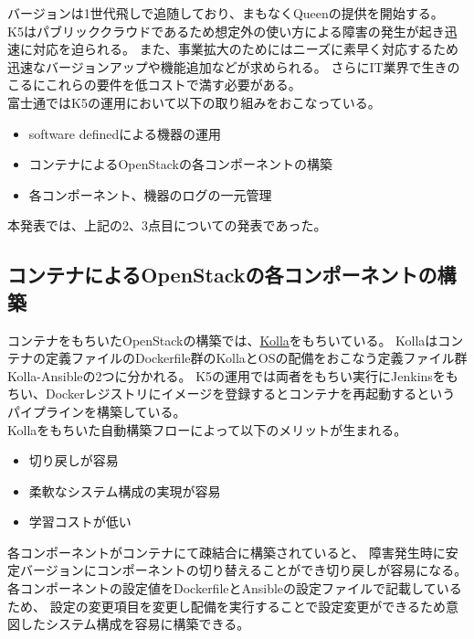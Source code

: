 バージョンは1世代飛しで追随しており、まもなくQueenの提供を開始する。\\

K5はパブリッククラウドであるため想定外の使い方による障害の発生が起き迅速に対応を迫られる。
また、事業拡大のためにはニーズに素早く対応するため迅速なバージョンアップや機能追加などが求められる。
さらにIT業界で生きのこるにこれらの要件を低コストで満す必要がある。\\

富士通ではK5の運用において以下の取り組みをおこなっている。

\begin{itemize}
\item software definedによる機器の運用
\item コンテナによるOpenStackの各コンポーネントの構築
\item 各コンポーネント、機器のログの一元管理
\end{itemize}

本発表では、上記の2、3点目についての発表であった。

\subsection*{コンテナによるOpenStackの各コンポーネントの構築}

コンテナをもちいたOpenStackの構築では、\href{https://docs.openstack.org/kolla/latest/}{Kolla}をもちいている。
Kollaはコンテナの定義ファイルのDockerfile群のKollaとOSの配備をおこなう定義ファイル群Kolla-Ansibleの2つに分かれる。
K5の運用では両者をもちい実行にJenkinsをもちい、Dockerレジストリにイメージを登録するとコンテナを再起動するというパイプラインを構築している。\\

Kollaをもちいた自動構築フローによって以下のメリットが生まれる。

\begin{itemize}
\item 切り戻しが容易
\item 柔軟なシステム構成の実現が容易
\item 学習コストが低い
\end{itemize}

各コンポーネントがコンテナにて疎結合に構築されていると、
障害発生時に安定バージョンにコンポーネントの切り替えることができ切り戻しが容易になる。\\

各コンポーネントの設定値をDockerfileとAnsibleの設定ファイルで記載しているため、
設定の変更項目を変更し配備を実行することで設定変更ができるため意図したシステム構成を容易に構築できる。\\

